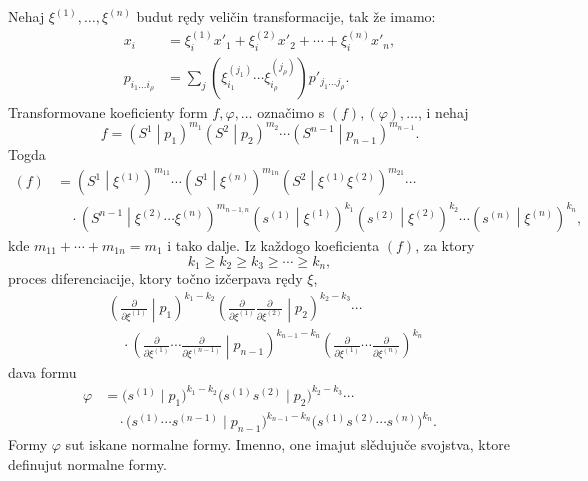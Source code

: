 \documentclass[11pt]{article}
\newcommand{\pair}[2]{\left(#1\middle|#2\right)}
\begin{document}
Nehaj $\xi^{(1)},\ldots,\xi^{(n)}$ budut rędy veličin transformacije, tak že imamo:
\begin{equation}
\begin{aligned}
x_i&=\xi_i^{(1)}x'_1+\xi_i^{(2)}x'_2+\cdots+\xi_i^{(n)}x'_n,\\
p_{i_1\ldots i_\rho}&=\sum_j(\xi_{i_1}^{(j_1)}\cdots \xi_{i_\rho}^{(j_\rho)})p'_{j_1\ldots j_\rho}.
\end{aligned}
\tag{47}
\end{equation}
Transformovane koeficienty form $f,\varphi,\ldots$ označimo s $(f),(\varphi),\ldots$, i nehaj
\[
 f=\pair{S^1}{p_1}^{m_1}\pair{S^2}{p_2}^{m_2}\cdots\pair{S^{n-1}}{p_{n-1}}^{m_{n-1}}.
\]
Togda
\begin{equation}
\begin{aligned}
(f)&=\pair{S^1}{\xi^{(1)}}^{m_{11}}\cdots
\pair{S^1}{\xi^{(n)}}^{m_{1n}}
\pair{S^2}{\xi^{(1)}\xi^{(2)}}^{m_{21}}\cdots\\
&\quad\cdot
\pair{S^{n-1}}{\xi^{(2)}\cdots\xi^{(n)}}^{m_{n-1,n}}
\pair{s^{(1)}}{\xi^{(1)}}^{k_1}
\pair{s^{(2)}}{\xi^{(2)}}^{k_2}\cdots
\pair{s^{(n)}}{\xi^{(n)}}^{k_n},
\end{aligned}
\tag{48}
\end{equation}
kde $m_{11}+\cdots+m_{1n}=m_1$ i tako dalje. Iz každogo koeficienta $(f)$, za ktory
\begin{equation}
 k_1\ge k_2\ge k_3\ge\cdots\ge k_n,
\tag{49}
\end{equation}
proces diferenciacije, ktory točno izčerpava rędy $\xi$,
\begin{equation}
\begin{aligned}
&\left(\frac{\partial}{\partial\xi^{(1)}}\middle|p_1\right)^{k_1-k_2}
\left(\frac{\partial}{\partial\xi^{(1)}}\frac{\partial}{\partial\xi^{(2)}}\middle|p_2\right)^{k_2-k_3}\cdots\\
&\quad\cdot
\left(\frac{\partial}{\partial\xi^{(1)}}\cdots\frac{\partial}{\partial\xi^{(n-1)}}\middle|p_{n-1}\right)^{k_{n-1}-k_n}
\left(\frac{\partial}{\partial\xi^{(1)}}\cdots\frac{\partial}{\partial\xi^{(n)}}\right)^{k_n}
\end{aligned}
\tag{50}
\end{equation}
dava formu
\begin{equation}
\begin{aligned}
 \varphi&=\bigl(s^{(1)}\mid p_1\bigr)^{k_1-k_2}
 \bigl(s^{(1)}s^{(2)}\mid p_2\bigr)^{k_2-k_3}\cdots\\
 &\quad\cdot
 \bigl(s^{(1)}\cdots s^{(n-1)}\mid p_{n-1}\bigr)^{k_{n-1}-k_n}
 \bigl(s^{(1)}s^{(2)}\cdots s^{(n)}\bigr)^{k_n}.
\end{aligned}
\tag{51}
\end{equation}
Formy $\varphi$ sut iskane normalne formy. Imenno, one imajut slědujuče svojstva, ktore definujut normalne formy.
\end{document}
